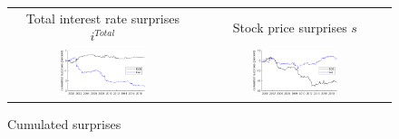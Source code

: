 \documentclass[a4paper,12pt]{article}
\begin{document}
\begin{figure}[!htbp]
\caption{Cumulated surprises}\label{fig: cumulated surprises}
\begin{center}
\begin{tabular}{cc}
\small Total interest rate surprises $i^{Total}$ & \small Stock price surprises $s$ \\
\includegraphics[width=0.47\textwidth]{figures/cumulated_surprises_pc1} &
\includegraphics[width=0.47\textwidth]{figures/cumulated_surprises_stock}\\
\end{tabular}
\end{center}
\end{figure}
\end{document}

